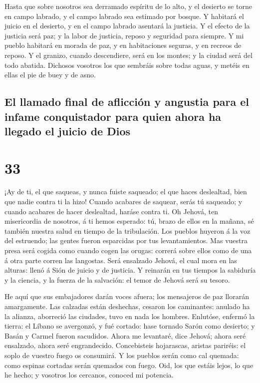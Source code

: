  Hasta que sobre nosotros sea derramado espíritu de lo
alto, y el desierto se torne en campo labrado, y el campo labrado sea
estimado por bosque.  Y habitará el juicio en el
desierto, y en el campo labrado asentará la justicia.  Y
el efecto de la justicia será paz; y la labor de justicia, reposo y
seguridad para siempre.  Y mi pueblo habitará en morada
de paz, y en habitaciones seguras, y en recreos de reposo.
 Y el granizo, cuando descendiere, será en los montes; y
la ciudad será del todo abatida.  Dichosos vosotros los
que sembráis sobre todas aguas, y metéis en ellas el pie de buey y de
asno.

\hypertarget{el-llamado-final-de-aflicciuxf3n-y-angustia-para-el-infame-conquistador-para-quien-ahora-ha-llegado-el-juicio-de-dios}{%
\subsection{El llamado final de aflicción y angustia para el infame
conquistador para quien ahora ha llegado el juicio de
Dios}\label{el-llamado-final-de-aflicciuxf3n-y-angustia-para-el-infame-conquistador-para-quien-ahora-ha-llegado-el-juicio-de-dios}}

\hypertarget{section-23-33}{%
\section{33}\label{section-23-33}}

 ¡Ay de ti, el que saqueas, y nunca fuiste saqueado; el
que haces deslealtad, bien que nadie contra ti la hizo! Cuando acabares
de saquear, serás tú saqueado; y cuando acabares de hacer deslealtad,
haráse contra ti.  Oh Jehová, ten misericordia de
nosotros, á ti hemos esperado: tú, brazo de ellos en la mañana, sé
también nuestra salud en tiempo de la tribulación.  Los
pueblos huyeron á la voz del estruendo; las gentes fueron esparcidas por
tus levantamientos.  Mas vuestra presa será cogida como
cuando cogen las orugas: correrá sobre ellos como de una á otra parte
corren las langostas.  Será ensalzado Jehová, el cual mora
en las alturas: llenó á Sión de juicio y de justicia.  Y
reinarán en tus tiempos la sabiduría y la ciencia, y la fuerza de la
salvación: el temor de Jehová será su tesoro.

 He aquí que sus embajadores darán voces afuera; los
mensajeros de paz llorarán amargamente.  Las calzadas
están deshechas, cesaron los caminantes: anulado ha la alianza,
aborreció las ciudades, tuvo en nada los hombres. 
Enlutóse, enfermó la tierra: el Líbano se avergonzó, y fué cortado: hase
tornado Sarón como desierto; y Basán y Carmel fueron sacudidos.
 Ahora me levantaré, dice Jehová; ahora seré ensalzado,
ahora seré engrandecido.  Concebisteis hojarascas,
aristas pariréis: el soplo de vuestro fuego os consumirá.
 Y los pueblos serán como cal quemada: como espinas
cortadas serán quemados con fuego.  Oid, los que estáis
lejos, lo que he hecho; y vosotros los cercanos, conoced mi potencia.

